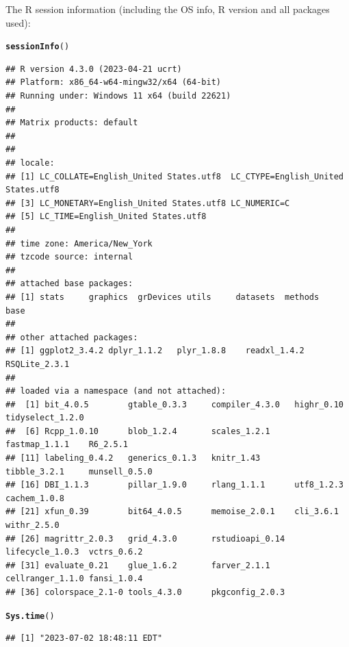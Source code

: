 \documentclass{article}\usepackage[]{graphicx}\usepackage[]{xcolor}
\makeatletter
\newcommand{\hlstd}[1]{\textcolor[rgb]{0.345,0.345,0.345}{#1}}%
\newcommand{\hlkwd}[1]{\textcolor[rgb]{0.737,0.353,0.396}{\textbf{#1}}}%
\newenvironment{kframe}{%
 \def\at@end@of@kframe{}%
 \ifinner\ifhmode%
  \def\at@end@of@kframe{\end{minipage}}%
  \begin{minipage}{\columnwidth}%
 \fi\fi%
 \def\FrameCommand##1{\hskip\@totalleftmargin \hskip-\fboxsep
 \colorbox{shadecolor}{##1}\hskip-\fboxsep
     \hskip-\linewidth \hskip-\@totalleftmargin \hskip\columnwidth}%
 \MakeFramed {\advance\hsize-\width
   \@totalleftmargin\z@ \linewidth\hsize
   \@setminipage}}%
 {\par\unskip\endMakeFramed%
 \at@end@of@kframe}
\newenvironment{knitrout}{}{} %
\makeatother
\begin{document}
The R session information (including the OS info, R version and all
packages used):

\begin{knitrout}
\color{fgcolor}\begin{kframe}
\begin{alltt}
\hlkwd{sessionInfo}\hlstd{()}
\end{alltt}
\begin{verbatim}
## R version 4.3.0 (2023-04-21 ucrt)
## Platform: x86_64-w64-mingw32/x64 (64-bit)
## Running under: Windows 11 x64 (build 22621)
## 
## Matrix products: default
## 
## 
## locale:
## [1] LC_COLLATE=English_United States.utf8  LC_CTYPE=English_United States.utf8   
## [3] LC_MONETARY=English_United States.utf8 LC_NUMERIC=C                          
## [5] LC_TIME=English_United States.utf8    
## 
## time zone: America/New_York
## tzcode source: internal
## 
## attached base packages:
## [1] stats     graphics  grDevices utils     datasets  methods   base     
## 
## other attached packages:
## [1] ggplot2_3.4.2 dplyr_1.1.2   plyr_1.8.8    readxl_1.4.2  RSQLite_2.3.1
## 
## loaded via a namespace (and not attached):
##  [1] bit_4.0.5        gtable_0.3.3     compiler_4.3.0   highr_0.10       tidyselect_1.2.0
##  [6] Rcpp_1.0.10      blob_1.2.4       scales_1.2.1     fastmap_1.1.1    R6_2.5.1        
## [11] labeling_0.4.2   generics_0.1.3   knitr_1.43       tibble_3.2.1     munsell_0.5.0   
## [16] DBI_1.1.3        pillar_1.9.0     rlang_1.1.1      utf8_1.2.3       cachem_1.0.8    
## [21] xfun_0.39        bit64_4.0.5      memoise_2.0.1    cli_3.6.1        withr_2.5.0     
## [26] magrittr_2.0.3   grid_4.3.0       rstudioapi_0.14  lifecycle_1.0.3  vctrs_0.6.2     
## [31] evaluate_0.21    glue_1.6.2       farver_2.1.1     cellranger_1.1.0 fansi_1.0.4     
## [36] colorspace_2.1-0 tools_4.3.0      pkgconfig_2.0.3
\end{verbatim}
\begin{alltt}
\hlkwd{Sys.time}\hlstd{()}
\end{alltt}
\begin{verbatim}
## [1] "2023-07-02 18:48:11 EDT"
\end{verbatim}
\end{kframe}
\end{knitrout}
\end{document}
